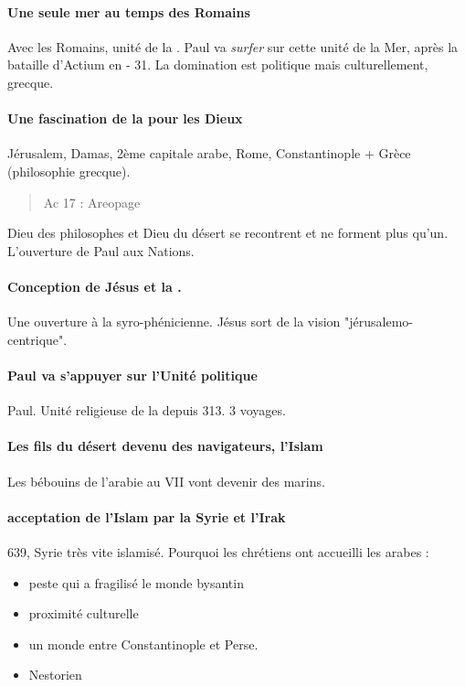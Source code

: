 \paragraph{Une seule mer au temps des Romains} Avec les Romains, unité de la \Med. Paul va \textit{surfer} sur cette unité de la Mer, après la bataille d'Actium en - 31. La domination est politique mais culturellement, grecque. 

\paragraph{Une fascination de la \Med pour les Dieux} Jérusalem, Damas, 2ème capitale arabe, Rome, Constantinople + Grèce (philosophie grecque).  
\begin{quote}
   Ac 17  : Areopage 
\end{quote}
Dieu des philosophes et Dieu du désert se recontrent et ne forment plus qu'un. L'ouverture de Paul aux Nations. 

\paragraph{Conception de Jésus et la \Med.} Une ouverture à la syro-phénicienne. Jésus sort de la vision "jérusalemo-centrique".

\paragraph{Paul va s'appuyer sur l'Unité politique}
Paul. Unité religieuse de la \Med depuis 313. 3 voyages. 

\paragraph{Les fils du désert devenu des navigateurs, l'Islam} Les bébouins de l'arabie au VII vont devenir des marins. 

\paragraph{acceptation de l'Islam par la Syrie et l'Irak} 639, Syrie très vite islamisé. Pourquoi les chrétiens ont accueilli les arabes : 
\begin{itemize}
    \item peste qui a fragilisé le monde bysantin
    \item proximité culturelle
    \item un monde entre Constantinople et Perse.
    \item Nestorien
\end{itemize}

